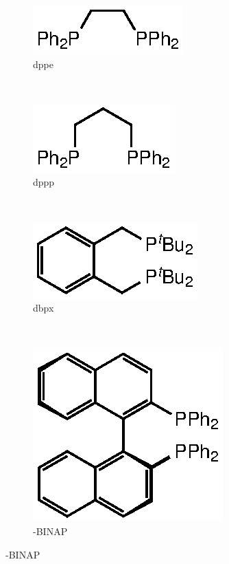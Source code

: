 \begin{figure}[htbp]
\centering
\begin{subfigure}[b]{0.3\textwidth}
	\centering
	\includegraphics{../Figures/Diphosphines/dppe.eps}
	\caption{dppe}
	\label{dppe}
\end{subfigure}
~
\begin{subfigure}[b]{0.3\textwidth}
	\centering
	\includegraphics{../Figures/Diphosphines/dppp.eps}
	\caption{dppp}
	\label{dppp}
\end{subfigure}
~
\begin{subfigure}[b]{0.3\textwidth}
	\centering
	\includegraphics{../Figures/Diphosphines/dbpx.eps}
	\caption{dbpx}
	\label{dbpx}
\end{subfigure}
\\
\vspace{0.5cm}
\begin{subfigure}[b]{0.3\textwidth}
	\centering
	\includegraphics{../Figures/Diphosphines/BINAP.eps}
	\caption{\sinister{}-BINAP}
	\label{BINAP}
\end{subfigure}

\end{figure}
